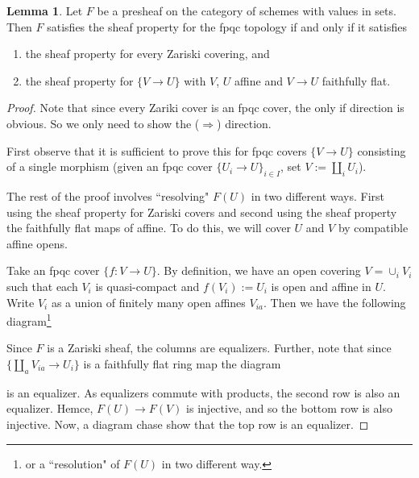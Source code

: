 \documentclass[11pt]{amsart}
\theoremstyle{definition}
\newtheorem{lemma}[theorem]{Lemma}
\begin{document}
\begin{lemma}
	\label{lemma-sheaf-property-fpqc}
	Let $F$ be a presheaf on the category of schemes with values in sets. Then $F$ satisfies the sheaf property for the fpqc topology if and only
	if it satisfies
	\begin{enumerate}
		\item the sheaf property for every Zariski covering, and
		\item the sheaf property for $\{V \to U\}$
		with $V$, $U$ affine and $V \to U$ faithfully flat.
	\end{enumerate}
\end{lemma}
\begin{proof}
	Note that since every Zariki cover is an fpqc cover, the only if direction is obvious. So we only need to show the ($\Rightarrow$) direction.
	
	First observe that it is sufficient to prove this for fpqc covers $\{V\rightarrow U\}$ consisting of a single morphism (given an fpqc cover $\{U_i\rightarrow U\}_{i\in I}$, set $V:=\amalg_i U_i$). 
	
	The rest of the proof involves ``resolving" $F(U)$ in two different ways. First using the sheaf property for Zariski covers and second using the sheaf property the faithfully flat maps of affine. To do this, we will cover $U$ and $V$ by compatible affine opens.
	
	Take an fpqc cover $\{f: V\rightarrow U\}$. By definition, we have an open covering $V=\cup_i V_i$ such that each $V_i$ is quasi-compact and $f(V_i):=U_i$ is open and affine in $U$. Write $V_i$ as a union of finitely many open affines $V_{ia}$. Then we have the following diagram\footnote{or a ``resolution" of $F(U)$ in two different way.}
	\begin{center}
	\end{center}
	Since $F$ is a Zariski sheaf, the columns are equalizers. Further, note that since  $\{\amalg_a V_{ia}\rightarrow U_i\}$ is a faithfully flat ring map the diagram
	\begin{center}
	\end{center}
	is an equalizer. As equalizers commute with products, the second row is also an equalizer. Hemce, $F(U)\rightarrow F(V)$ is injective, and so the bottom row is also injective. Now, a diagram chase show that the top row is an equalizer.
\end{proof}
\end{document}
